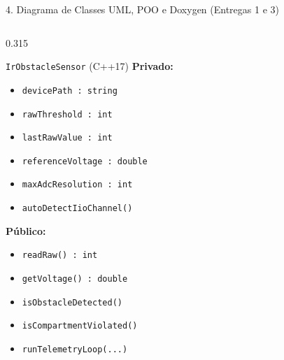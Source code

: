 \documentclass[aspectratio=169,10pt]{beamer}
\begin{document}
\begin{frame}[fragile]{4. Diagrama de Classes UML, POO e Doxygen (Entregas 1 e 3)}
  \begin{columns}[T,onlytextwidth]
    \begin{column}{0.315\textwidth}
      \begin{block}{\texttt{IrObstacleSensor} (C++17)}
        \tiny
        \textbf{Privado:}
        \begin{itemize}\setlength\itemsep{1pt}
          \item \texttt{devicePath : string}
          \item \texttt{rawThreshold : int}
          \item \texttt{lastRawValue : int}
          \item \texttt{referenceVoltage : double}
          \item \texttt{maxAdcResolution : int}
          \item \texttt{autoDetectIioChannel()}
        \end{itemize}
        \textbf{P\'{u}blico:}
        \begin{itemize}\setlength\itemsep{1pt}
          \item \texttt{readRaw() : int}
          \item \texttt{getVoltage() : double}
          \item \texttt{isObstacleDetected()}
          \item \texttt{isCompartmentViolated()}
          \item \texttt{runTelemetryLoop(...)}
        \end{itemize}
      \end{block}
    \end{column}


\end{columns}
\end{frame}
\end{document}
